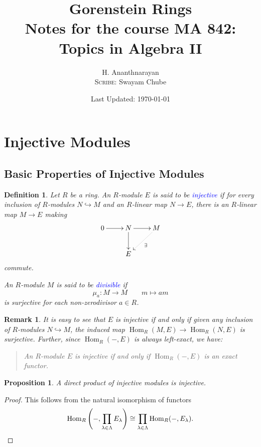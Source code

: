 \documentclass[10pt]{article}
\title{Gorenstein Rings\\\small{Notes for the course MA 842: Topics in Algebra II}}
\author{H. Ananthnarayan\\\small\textsc{Scribe:} Swayam Chube}
\date{Last Updated: \today}
\theoremstyle{thmstyle}
\newtheorem{proposition}[theorem]{Proposition}
\theoremstyle{defstyle}
\newtheorem{definition}[theorem]{Definition}
\newtheorem{remark}[theorem]{Remark}
\newcommand{\Hom}{\operatorname{Hom}}
\newcommand{\into}{\hookrightarrow}
\newcommand{\define}[1]{\textcolor{blue}{\textit{#1}}}
\begin{document}
\maketitle
\tableofcontents

\section{Injective Modules}

\subsection{Basic Properties of Injective Modules}

\begin{definition}
    Let $R$ be a ring. An $R$-module $E$ is said to be \define{injective} if for every inclusion of $R$-modules $N\into M$ and an $R$-linear map $N\to E$, there is an $R$-linear map $M\to E$ making
    \begin{equation*}
        \xymatrix {
            0\ar[r] & N\ar[r]\ar[d] & M\ar@{.>}[ld]^{\exists}\\
            & E & 
        }
    \end{equation*}
    commute.

    An $R$-module $M$ is said to be \define{divisible} if 
    \begin{equation*}
        \mu_a: M\longrightarrow M\qquad m\longmapsto am
    \end{equation*}
    is surjective for each non-zerodivisor $a\in R$.
\end{definition}

\begin{remark}
    It is easy to see that $E$ is injective if and only if given any inclusion of $R$-modules $N\into M$, the induced map $\Hom_R(M, E)\to\Hom_R(N, E)$ is surjective. Further, since $\Hom_R(-, E)$ is always left-exact, we have: 
    \begin{quotation}
        An $R$-module $E$ is injective if and only if $\Hom_R(-, E)$ is an exact functor.
    \end{quotation}
\end{remark}

\begin{proposition}
    A direct product of injective modules is injective.
\end{proposition}
\begin{proof}
    This follows from the natural isomorphism of functors
    \begin{equation*}
        \Hom_R\left(-,\prod_{\lambda\in\Lambda} E_\lambda\right)\cong\prod_{\lambda\in\Lambda} \Hom_R(-, E_\lambda).\qedhere
    \end{equation*}
\end{proof}
\end{document}
